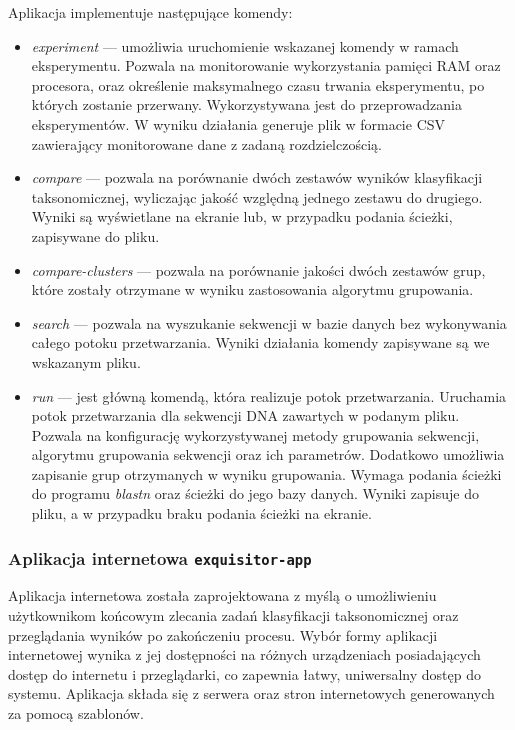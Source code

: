             Aplikacja implementuje następujące komendy:
            \begin{itemize}
                \item {
                    \textit{experiment} --- umożliwia uruchomienie wskazanej komendy w ramach eksperymentu. Pozwala na monitorowanie wykorzystania pamięci RAM oraz procesora, oraz określenie maksymalnego czasu trwania eksperymentu, po których zostanie przerwany. Wykorzystywana jest do przeprowadzania eksperymentów. W wyniku działania generuje plik w formacie CSV zawierający monitorowane dane z zadaną rozdzielczością.
                }
                \item {
                    \textit{compare} --- pozwala na porównanie dwóch zestawów wyników klasyfikacji taksonomicznej, wyliczając jakość względną jednego zestawu do drugiego. Wyniki są wyświetlane na ekranie lub, w przypadku podania ścieżki, zapisywane do pliku.
                }
                \item {
                    \textit{compare-clusters} --- pozwala na porównanie jakości dwóch zestawów grup, które zostały otrzymane w wyniku zastosowania algorytmu grupowania.
                }
                \item {
                    \textit{search} --- pozwala na wyszukanie sekwencji w bazie danych bez wykonywania całego potoku przetwarzania. Wyniki działania komendy zapisywane są we wskazanym pliku.
                }
                \item {
                    \textit{run} --- jest główną komendą, która realizuje potok przetwarzania. Uruchamia potok przetwarzania dla sekwencji DNA zawartych w podanym pliku. Pozwala na konfigurację wykorzystywanej metody grupowania sekwencji, algorytmu grupowania sekwencji oraz ich parametrów. Dodatkowo umożliwia zapisanie grup otrzymanych w wyniku grupowania. Wymaga podania ścieżki do programu \textit{blastn} oraz ścieżki do jego bazy danych. Wyniki zapisuje do pliku, a w przypadku braku podania ścieżki na ekranie.
                }
            \end{itemize}

        \subsubsection{Aplikacja internetowa \texttt{exquisitor-app}}
            Aplikacja internetowa została zaprojektowana z myślą o umożliwieniu użytkownikom końcowym zlecania zadań klasyfikacji taksonomicznej oraz przeglądania wyników po zakończeniu procesu. Wybór formy aplikacji internetowej wynika z jej dostępności na różnych urządzeniach posiadających dostęp do internetu i przeglądarki, co zapewnia łatwy, uniwersalny dostęp do systemu. Aplikacja składa się z serwera oraz stron internetowych generowanych za pomocą szablonów.

